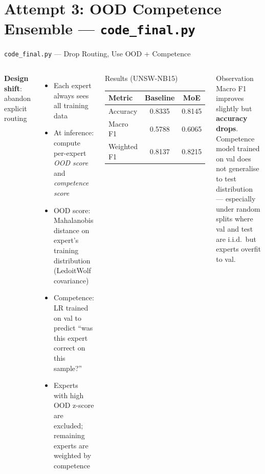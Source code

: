 \documentclass[aspectratio=169,10pt]{beamer}
\begin{document}
\section{Attempt 3: OOD Competence Ensemble --- \texttt{code\_final.py}}

\begin{frame}{\texttt{code\_final.py} --- Drop Routing, Use OOD + Competence}
  \begin{columns}[T]
      \textbf{Design shift}: abandon explicit routing
      \begin{itemize}
        \item Each expert always sees all training data
        \item At inference: compute per-expert \emph{OOD score}
              and \emph{competence score}
        \item OOD score: Mahalanobis distance on expert's training
              distribution (LedoitWolf covariance)
        \item Competence: LR trained on val to predict
              ``was this expert correct on this sample?''
        \item Experts with high OOD z-score are excluded;
              remaining experts are weighted by competence
      \end{itemize}
      \begin{block}{Results (UNSW-NB15)}
        \footnotesize
        \begin{tabular}{lcc}
          \toprule
          Metric & Baseline & MoE \\
          \midrule
          Accuracy       & 0.8335 & 0.8145 \\
          Macro F1       & 0.5788 & 0.6065 \\
          Weighted F1    & 0.8137 & 0.8215 \\
          \bottomrule
        \end{tabular}
      \end{block}
      \vspace{4pt}
      \begin{alertblock}{Observation}
        Macro F1 improves slightly but \textbf{accuracy drops}.
        Competence model trained on val does not generalise
        to test distribution --- especially under random splits
        where val and test are i.i.d.\ but experts overfit to val.
      \end{alertblock}
  \end{columns}
\end{frame}
\end{document}
